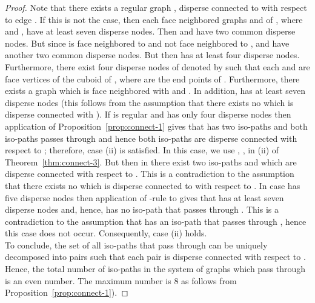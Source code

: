 \documentclass[a4paper,11pt]{article}
\begin{document}
\begin{proof}
Note that there exists a
regular graph , disperse connected to  with respect to edge . If this is
not the case, then each face neighbored graphs  and  of , where
 and , have at least seven disperse nodes.
Then  and  have two common disperse nodes. But since  is face neighbored
to  and not face neighbored to ,  and  have another two common
disperse nodes. But then  has at least four disperse nodes. Furthermore, there exist
four disperse nodes of  denoted by  such that each 
and  are face vertices of the cuboid of , where  are the end points
of . Furthermore, there exists a graph  which is face neighbored with  and . In
addition,   has at least seven disperse nodes (this follows from the assumption that there exists
no  which is disperse connected with ). If  is regular and has
only four disperse nodes then application of Proposition~\ref{prop:connect-1} gives that 
has two iso-paths and both iso-paths passes through  and hence both iso-paths are disperse connected
with respect to ; therefore, case (ii) is satisfied. In this case,
we use , ,   in (ii) of Theorem~\ref{thm:connect-3}. But then
in  there exist two iso-paths  and  which are disperse connected
with respect to . This is a contradiction to the assumption that there exists no
 which is disperse connected to  with respect to . In case  has
five disperse nodes then application of -rule to  gives that  has at
least seven disperse nodes and, hence,  has no iso-path that passes through . This is
a contradiction to the assumption that  has an iso-path that passes through
, hence this case does not occur. Consequently, case (ii) holds.\\

To conclude, the set of all iso-paths that pass through  can be uniquely decomposed into pairs
such that each pair is disperse connected with respect to . Hence, the total number of iso-paths in
the system of graphs which pass through  is an even number. The maximum number is 8 as follows
from Proposition~\ref{prop:connect-1}).
\end{proof}
\end{document}
